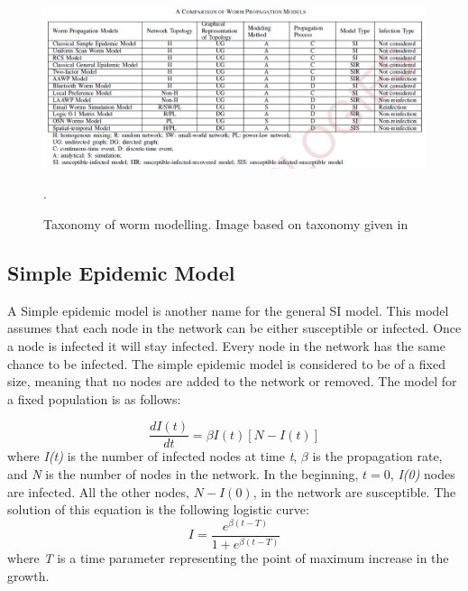 

\begin{figure}
\centering
\includegraphics[scale=0.55]{Images/tableworms.png}
\caption{Taxonomy of worm modelling. Image based on taxonomy given in \cite{wang2014modeling}}.
\label{tree}
\end{figure}


\subsection{Simple Epidemic Model}
A Simple epidemic model is another name for the general SI model. This model assumes that each node in the network can be either susceptible or infected. 
Once a node is infected it will stay infected. Every node in the network has the same chance to be infected. 
The simple epidemic model is considered to be of a fixed size, meaning that no nodes are added to the network or removed. The model for a fixed population is as follows:

\begin{equation}
\dfrac{d I(t)}{dt} = \beta I(t)[N-I(t)]
\end{equation} 
where \textit{I(t)} is the number of infected nodes at time \textit{t}, $\beta$ is the propagation rate, and \textit{N} is the number of nodes in the network. In the beginning, $t=0$, \textit{I(0)} nodes are infected. All the other nodes, $N - I(0)$, in the network are susceptible. 
The solution of this equation is the following logistic curve:
\begin{equation}
I = \dfrac{e^{\beta(t-T)}}{1+e^{\beta(t-T)}}
\label{SIdelay}
\end{equation}
where \textit{T} is a time parameter representing the point of maximum increase in the growth.\\



